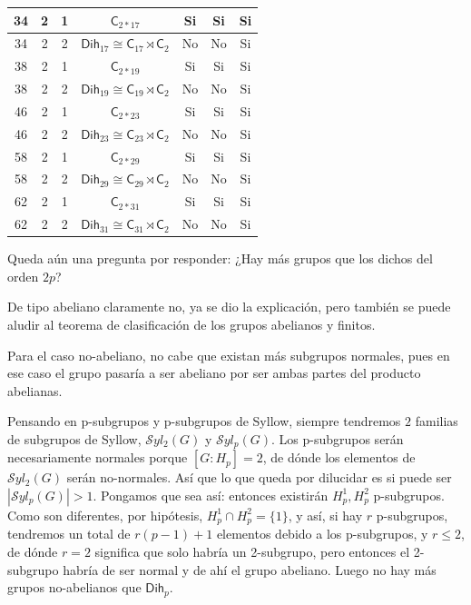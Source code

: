 \documentclass[12pt,a4paper,fleqn,spanish,final,openright]{extbook}
\theoremstyle{definition}
\theoremstyle{remark}
\begin{document}
\begin{table}[h!]
\begin{center}
\begin{tabular}{c|c|c|c|c|c|c}
            \hline
            34 & 2 & 1 & ${\textsf{C}}_{2*17}$ & Si & Si & Si \\
            \hline
            34 & 2 & 2  & ${{\textsf{Dih}}_{17}}     \cong     {{\textsf{C}}_{17}}\rtimes{{{\textsf{C}}_{2}}}$ & No & No & Si \\
            \hline
            38 & 2 & 1 & ${\textsf{C}}_{2*19}$ & Si & Si & Si \\
            \hline
            38 & 2 & 2  & ${{\textsf{Dih}}_{19}}     \cong     {{\textsf{C}}_{19}}\rtimes{{{\textsf{C}}_{2}}}$ & No & No & Si \\
            \hline
            46 & 2 & 1 & ${\textsf{C}}_{2*23}$ & Si & Si & Si \\
            \hline
            46 & 2 & 2  & ${{\textsf{Dih}}_{23}}     \cong     {{\textsf{C}}_{23}}\rtimes{{{\textsf{C}}_{2}}}$ & No & No & Si \\
            \hline
            58 & 2 & 1 & ${\textsf{C}}_{2*29}$ & Si & Si & Si \\
            \hline
            58 & 2 & 2  & ${{\textsf{Dih}}_{29}}     \cong     {{\textsf{C}}_{29}}\rtimes{{{\textsf{C}}_{2}}}$ & No & No & Si \\
            \hline
            62 & 2 & 1 & ${\textsf{C}}_{2*31}$ & Si & Si & Si \\
            \hline
            62 & 2 & 2  & ${{\textsf{Dih}}_{31}}     \cong     {{\textsf{C}}_{31}}\rtimes{{{\textsf{C}}_{2}}}$ & No & No & Si \\
            \hline
        \end{tabular}
    \end{center}
\end{table}








    Queda aún una pregunta por responder: ¿Hay más grupos que los dichos del orden $2p$?

    De tipo abeliano claramente no, ya se dio la explicación, pero también se puede aludir al teorema de clasificación de los grupos abelianos y finitos.

    Para el caso no-abeliano, no cabe que existan más subgrupos normales, pues en ese caso el grupo pasaría a ser abeliano por ser ambas partes del producto abelianas.

    Pensando en p-subgrupos y p-subgrupos de Syllow, siempre tendremos $2$ familias de subgrupos de Syllow, $\mathcal{S}yl_2 (G)$ y $\mathcal{S}yl_p (G)$. Los p-subgrupos serán necesariamente normales porque $[G:H_p]=2$, de dónde los elementos de $\mathcal{S}yl_2 (G)$ serán no-normales. Así que lo que queda por dilucidar es si puede ser $\left|\mathcal{S}yl_{p}(G)\right|>1$. Pongamos que sea así: entonces existirán $H_p^1,H_p^2$ p-subgrupos. Como son diferentes, por hipótesis, $H_p^1    \cap H_p^2 = \{1\}$, y así, si hay $r$ p-subgrupos, tendremos un total de $r(p-1)+1$ elementos debido a los p-subgrupos, y $r   \le 2$, de dónde $r=2$ significa que solo habría un 2-subgrupo, pero entonces el 2-subgrupo habría de ser normal y de ahí el grupo abeliano. Luego no hay más grupos no-abelianos que ${\mathsf{Dih}}_{p}$.
\end{document}
